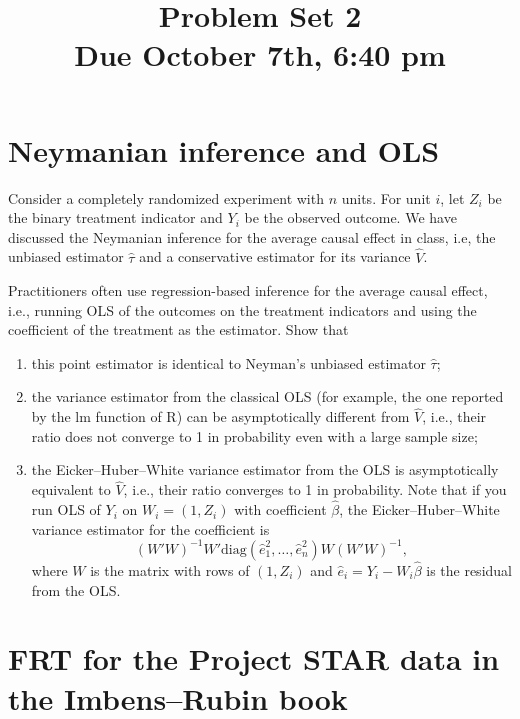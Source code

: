\documentclass[11pt]{article}
\theoremstyle{definition}
\begin{document}
\doublespacing
\title{\bf  Problem Set 2\\
Due October 7th, 6:40 pm
}
\date{}
\maketitle


\section{Neymanian inference and OLS}


Consider a completely randomized experiment with $n$ units. For unit $i$, let $Z_i$ be the binary treatment indicator and $Y_i$ be the observed outcome. We have discussed the Neymanian inference for the average causal effect in class, i.e, the unbiased estimator $\hat{\tau}$ and a conservative estimator for its variance $\hat{V}$. 

Practitioners often use regression-based inference for the average causal effect, i.e., running OLS of the outcomes on the treatment indicators and using the coefficient of the treatment as the estimator. Show that
\begin{enumerate}
[(1)]
\item
this point estimator is identical to Neyman's unbiased estimator $\hat{\tau}$;

\item
the variance estimator from the classical OLS (for example, the one reported by the lm function of R) can be asymptotically different from $\hat{V}$, i.e., their ratio does not converge to 1 in probability even with a large sample size;

\item
the Eicker--Huber--White variance estimator from the OLS is asymptotically equivalent to $\hat{V}$, i.e., their ratio converges to 1 in probability. 
Note that if you run OLS of $Y_i$ on $W_i = (1,Z_i)$ with coefficient $\hat{\beta}$, the Eicker--Huber--White variance estimator for the coefficient is
$$
(W'W)^{-1} W' \text{diag}( \hat{e}_1^2, \ldots, \hat{e}_n^2 ) W (W'W)^{-1},
$$
where $W$ is the matrix with rows of $(1,Z_i)$ and $\hat{e}_i = Y_i  - W_i \hat{\beta}$ is the residual from the OLS. 
\end{enumerate}





\section{FRT for the Project STAR data in the Imbens--Rubin book}
\end{document}
